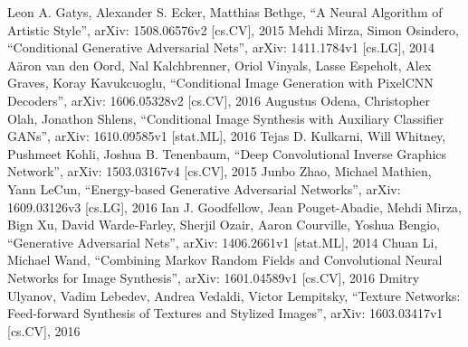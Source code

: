 \documentclass[a4paper]{article}
\begin{document}
	\renewcommand\refname{\centering СПИСОК ИСПОЛЬЗОВАННЫХ ИСТОЧНИКОВ}
	
	\setcounter{page}{2}
	\tableofcontents
	
	
	
	
	
	\begin{thebibliography}{99}
		 Leon A. Gatys, Alexander S. Ecker, Matthias Bethge, ``A Neural Algorithm of Artistic Style'', arXiv: 1508.06576v2 [cs.CV], 2015
		 Mehdi Mirza, Simon Osindero, ``Conditional Generative Adversarial Nets'', arXiv: 1411.1784v1 [cs.LG], 2014
		 A\"aron van den Oord, Nal Kalchbrenner, Oriol Vinyals, Lasse Espeholt, Alex Graves, Koray Kavukcuoglu, ``Conditional Image Generation with PixelCNN Decoders'', arXiv: 1606.05328v2 [cs.CV], 2016
		 Augustus Odena, Christopher Olah, Jonathon Shlens, ``Conditional Image Synthesis with Auxiliary Classifier GANs'', arXiv: 1610.09585v1 [stat.ML], 2016
		 Tejas D. Kulkarni, Will Whitney, Pushmeet Kohli, Joshua B. Tenenbaum, ``Deep Convolutional Inverse Graphics Network'', arXiv: 1503.03167v4 [cs.CV], 2015
		 Junbo Zhao, Michael Mathien, Yann LeCun, ``Energy-based Generative Adversarial Networks'', arXiv: 1609.03126v3 [cs.LG], 2016
		 Ian J. Goodfellow, Jean Pouget-Abadie, Mehdi Mirza, Bign Xu, David Warde-Farley, Sherjil Ozair, Aaron Courville, Yoshua Bengio, ``Generative Adversarial Nets'', arXiv: 1406.2661v1 [stat.ML], 2014
		 Chuan Li, Michael Wand, ``Combining Markov Random Fields and Convolutional Neural Networks for Image Synthesis'', arXiv: 1601.04589v1 [cs.CV], 2016
		 Dmitry Ulyanov, Vadim Lebedev, Andrea Vedaldi, Victor Lempitsky, ``Texture Networks: Feed-forward Synthesis of Textures and Stylized Images'', arXiv: 1603.03417v1 [cs.CV], 2016
	\end{thebibliography}
	
\end{document}
